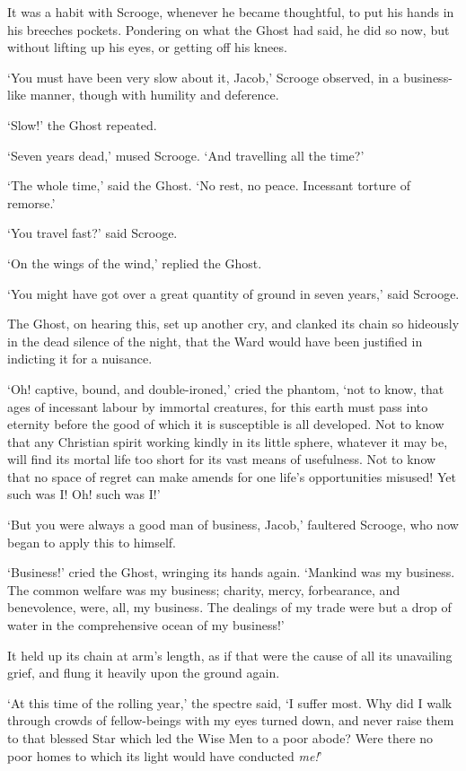 \documentclass[11pt,twoside]{article}\makeatletter
\begin{document}
It was a habit with Scrooge, whenever he became thoughtful, to put his hands in his breeches pockets.  Pondering on what the Ghost had said, he did so now, but without lifting up his eyes, or getting off his knees.  \par
‘You must have been very slow about it, Jacob,’ Scrooge observed, in a business-like manner, though with humility and deference.   \par
‘Slow!’ the Ghost repeated.  \par
‘Seven years dead,’ mused Scrooge. ‘And travelling all the time?’  \par
‘The whole time,’ said the Ghost.  ‘No rest, no peace. Incessant torture of remorse.’  \par
‘You travel fast?’ said Scrooge.  \par
‘On the wings of the wind,’ replied the Ghost.  \par
‘You might have got over a great quantity of ground in seven years,’ said Scrooge.  \par
The Ghost, on hearing this, set up another cry, and clanked its chain so hideously in the dead silence of the night, that the Ward would have been justified in indicting it for a nuisance.  \par
‘Oh! captive, bound, and double-ironed,’ cried the phantom, ‘not to know, that ages of incessant labour by immortal creatures, for this earth must pass into eternity before the good of which it is susceptible is all developed. Not to know that any Christian spirit working kindly in its little sphere, whatever it may be, will find its mortal life too short for its vast means of usefulness.  Not to know that no space of regret can make amends for one life's opportunities misused!  Yet such was I!  Oh! such was I!’  \par
‘But you were always a good man of business, Jacob,’ faultered Scrooge, who now began to apply this to himself.  \par
‘Business!’ cried the Ghost, wringing its hands again.  ‘Mankind was my business.  The common welfare was my business; charity, mercy, forbearance, and benevolence, were, all, my business.  The dealings of my trade were but a drop of water in the comprehensive ocean of my business!’  \par
It held up its chain at arm's length, as if that were the cause of all its unavailing grief, and flung it heavily upon the ground again.  \par
‘At this time of the rolling year,’ the spectre said, ‘I suffer most.  Why did I walk through crowds of fellow-beings with my eyes turned down, and never raise them to that blessed Star which led the Wise Men to a poor abode? Were there no poor homes to which its light would have conducted \textit{me!}’  \par
\end{document}
